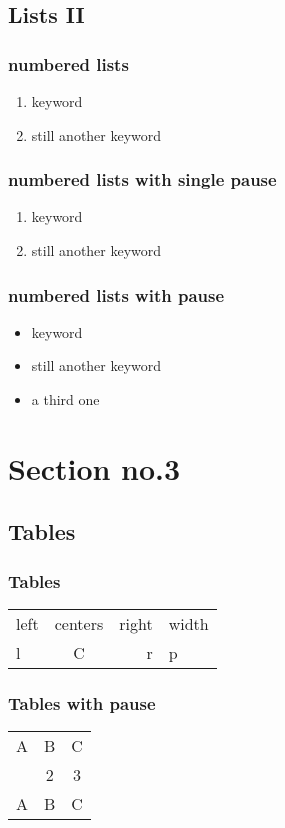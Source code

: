 \documentclass[hyperref={pdfpagelabels=false}]{beamer}
\begin{document}
\subsection{Lists II}
\begin{frame}
\frametitle{numbered lists}
\begin{enumerate}
\item keyword
\item still another keyword
\end{enumerate}
\end{frame}

\begin{frame}
\frametitle{numbered lists with single pause}
\begin{enumerate}
\item keyword  \pause 
\item still another keyword
\end{enumerate}
\end{frame}

\begin{frame}
\frametitle{numbered lists with pause}
\begin{itemize}[<+->]
\item keyword  
\item still another keyword
\item a third one 
\end{itemize} 
\end{frame}



\section{Section no.3} 
\subsection{Tables}
\begin{frame}
\frametitle{Tables}
\begin{tabular}{|l|c|r|p{1.5 cm }|}
\hline
left & centers & right & width \\
l & C & r & p \\
\hline
\end{tabular}
\end{frame}


\begin{frame}
\frametitle{Tables with pause}
\begin{tabular}{c c c}
A & B & C \\ 
\pause 
1 & 2 & 3 \\  
\pause 
A & B & C \\ 
\end{tabular} 
\end{frame}
\end{document}
